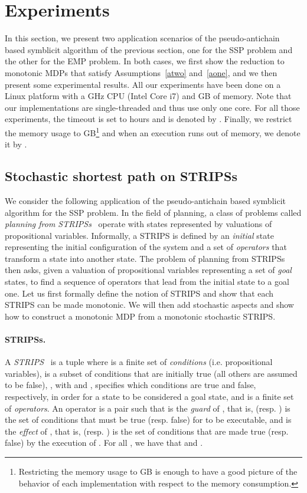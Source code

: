 \section{Experiments} \label{sec:experiments}
In this section, we present two application scenarios of the pseudo-antichain based symblicit algorithm of the previous section, one for the SSP problem and the other for the EMP problem. In both cases, we first show the reduction to monotonic MDPs that satisfy Assumptions~\ref{atwo} and~\ref{aone}, and we then present some experimental results. All our experiments have been done on a Linux platform with a GHz CPU (Intel Core i7) and GB of memory. Note that our implementations are single-threaded and thus use only one core. For all those experiments, the timeout is set to  hours and is denoted by \timeout. Finally, we restrict the memory usage to GB\footnote{Restricting the memory usage to GB is enough to have a good picture of the behavior of each implementation with respect to the memory consumption.} and when an execution runs out of memory, we denote it by \memout.

\subsection{Stochastic shortest path on STRIPSs}
We consider the following application of the pseudo-antichain based symblicit algorithm for the SSP problem. In the field of planning, a class of problems called \textit{planning from STRIPSs}~\cite{fikes1972strips} operate with states represented by valuations of propositional variables. Informally, a STRIPS is defined by an \textit{initial} state representing the initial configuration of the system and a set of \textit{operators} that transform a state into another state. The problem of planning from STRIPSs then asks, given a valuation of propositional variables representing a set of \textit{goal} states, to find a sequence of operators that lead from the initial state to a goal one. Let us first formally define the notion of STRIPS and show that each STRIPS can be made monotonic. We will then add stochastic aspects and show how to construct a monotonic MDP from a monotonic stochastic STRIPS.

\paragraph{STRIPSs.} A \textit{STRIPS}~\cite{fikes1972strips} is a tuple  where  is a finite set of \textit{conditions} (i.e. propositional variables),  is a subset of conditions that are initially true (all others are assumed to be false), , with  and , specifies which conditions are true and false, respectively, in order for a state to be considered a goal state, and  is a finite set of \textit{operators}. An operator  is a pair  such that  is the \textit{guard} of , that is,  (resp. ) is the set of conditions that must be true (resp. false) for  to be executable, and  is the \textit{effect} of , that is,  (resp. ) is the set of conditions that are made true (resp. false) by the execution of . For all , we have that  and .

